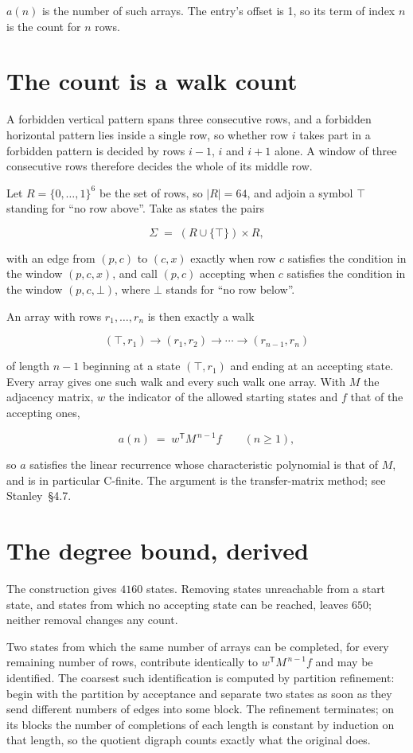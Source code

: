 \documentclass[11pt]{article}
\theoremstyle{definition}
\begin{document}
$a(n)$ is the number of such arrays. The entry's offset is 1, so its term of index $n$ is the count for $n$ rows.

\section{The count is a walk count}

A forbidden vertical pattern spans three consecutive rows, and a forbidden horizontal pattern lies inside a single row, so whether row $i$ takes part in a forbidden pattern is decided by rows $i-1$, $i$ and $i+1$ alone. A window of three consecutive rows therefore decides the whole of its middle row.

Let $R = \{0,\dots,1\}^{6}$ be the set of rows, so $|R| = 64$, and adjoin a symbol $\top$ standing for ``no row above''. Take as states the pairs

\[\Sigma \;=\; (R \cup \{\top\}) \times R,\]

with an edge from $(p,c)$ to $(c,x)$ exactly when row $c$ satisfies the condition in the window $(p,c,x)$, and call $(p,c)$ accepting when $c$ satisfies the condition in the window $(p,c,\bot)$, where $\bot$ stands for ``no row below''.

An array with rows $r_1,\dots,r_n$ is then exactly a walk

\[(\top,r_1) \to (r_1,r_2) \to \cdots \to (r_{n-1},r_n)\]

of length $n-1$ beginning at a state $(\top,r_1)$ and ending at an accepting state. Every array gives one such walk and every such walk one array. With $M$ the adjacency matrix, $w$ the indicator of the allowed starting states and $f$ that of the accepting ones,

\[a(n) \;=\; w^{\mathsf T} M^{\,n-1} f \qquad (n \ge 1),\]

so $a$ satisfies the linear recurrence whose characteristic polynomial is that of $M$, and is in particular C-finite. The argument is the transfer-matrix method; see Stanley~\S4.7.

\section{The degree bound, derived}

The construction gives $4160$ states. Removing states unreachable from a start state, and states from which no accepting state can be reached, leaves $650$; neither removal changes any count.

Two states from which the same number of arrays can be completed, for every remaining number of rows, contribute identically to $w^{\mathsf T}M^{\,n-1}f$ and may be identified. The coarsest such identification is computed by partition refinement: begin with the partition by acceptance and separate two states as soon as they send different numbers of edges into some block. The refinement terminates; on its blocks the number of completions of each length is constant by induction on that length, so the quotient digraph counts exactly what the original does.
\end{document}
